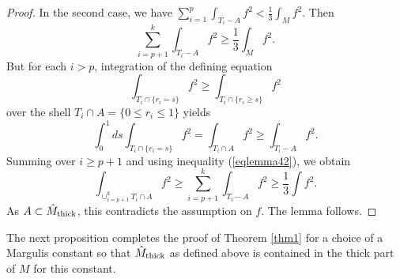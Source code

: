 \documentclass[11pt]{amsart}
\theoremstyle{plain}
\theoremstyle{plain}
\theoremstyle{definition}
\begin{document}
\begin{proof}
In the second case, we have
$\sum_{i=1}^p\int_{T_i-A}f^2< \frac{1}{3}\int_Mf^2$.
Then 
\begin{equation}\label{eqlemma42}
\sum_{i=p+1}^k\int_{T_i-A}f^2\geq \frac{1}{3}\int_M f^2.
\end{equation} 
But for each $i>p$, integration of the defining equation
\begin{equation}\label{integral2}
\int_{T_i\cap \{r_i=s\}}f^2\geq 
\int_{T_i\cap \{r_i\geq s\}}f^2\end{equation}
over the shell $T_i\cap A=\{0\leq r_i\leq 1\}$ yields
\[\int_0^1ds \int_{T_i\cap \{r_i=s\}}f^2=
 \int_{T_i\cap A}f^2\geq \int_{T_i-A}f^2.\]
Summing over $i\geq p+1$ and using inequality
(\ref{eqlemma42}), we obtain
\[\int_{\cup_{i=p+1}^kT_i\cap A}f^2\geq \sum_{i=p+1}^k\int_{T_i-A}f^2
\geq \frac{1}{3}\int f^2.\]
As $A\subset \hat M_{\rm thick}$, this 
contradicts the assumption on $f$. The
lemma follows. 
\end{proof}

The next proposition completes the proof of Theorem \ref{thm1} for a choice of a Margulis
constant so that $\hat M_{\rm thick}$ as defined above is contained in the
thick part of $M$ for this constant. 
   
\end{document}
